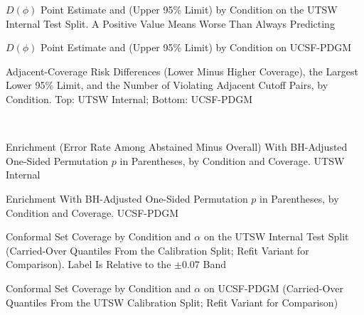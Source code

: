 \documentclass[journal]{IEEEtran}
\begin{document}
\begin{table}[!ht]
\centering
\caption{$D(\phi)$ Point Estimate and (Upper 95\% Limit) by Condition on the UTSW Internal Test Split. A Positive Value Means Worse Than Always Predicting}
\label{tab:deltaint}
\footnotesize

\end{table}

\begin{table}[!ht]
\centering
\caption{$D(\phi)$ Point Estimate and (Upper 95\% Limit) by Condition on UCSF-PDGM}
\label{tab:deltaext}
\footnotesize

\end{table}

\begin{table}[!ht]
\centering
\caption{Adjacent-Coverage Risk Differences (Lower Minus Higher Coverage), the Largest Lower 95\% Limit, and the Number of Violating Adjacent Cutoff Pairs, by Condition. Top: UTSW Internal; Bottom: UCSF-PDGM}
\label{tab:mono}
\footnotesize
 \\[6pt]

\end{table}

\begin{table}[!ht]
\centering
\caption{Enrichment (Error Rate Among Abstained Minus Overall) With BH-Adjusted One-Sided Permutation $p$ in Parentheses, by Condition and Coverage. UTSW Internal}
\label{tab:enrichint}
\footnotesize

\end{table}

\begin{table}[!ht]
\centering
\caption{Enrichment With BH-Adjusted One-Sided Permutation $p$ in Parentheses, by Condition and Coverage. UCSF-PDGM}
\label{tab:enrichext}
\footnotesize

\end{table}

\begin{table}[!ht]
\centering
\caption{Conformal Set Coverage by Condition and $\alpha$ on the UTSW Internal Test Split (Carried-Over Quantiles From the Calibration Split; Refit Variant for Comparison). Label Is Relative to the $\pm0.07$ Band}
\label{tab:confint}
\footnotesize

\end{table}

\begin{table}[!ht]
\centering
\caption{Conformal Set Coverage by Condition and $\alpha$ on UCSF-PDGM (Carried-Over Quantiles From the UTSW Calibration Split; Refit Variant for Comparison)}
\label{tab:confext}
\footnotesize

\end{table}
\end{document}

